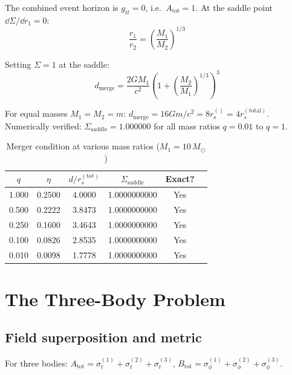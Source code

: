\documentclass[11pt,a4paper]{article}
\theoremstyle{plain}
\theoremstyle{definition}
\theoremstyle{remark}
\newcommand{\Ms}{M_\odot}
\newcommand{\sig}[2]{\sigma_{#1}^{(#2)}}
\newcommand{\rs}[1]{r_{\mathrm{s}}^{(#1)}}
\begin{document}
The combined event horizon is $g_{tt} = 0$, i.e.\ $A_{\mathrm{tot}} = 1$.  At the saddle point $\dd\Sigma/\dd r_1 = 0$:
\begin{equation}
  \frac{r_1}{r_2} = \left(\frac{M_1}{M_2}\right)^{1/3}
\end{equation}

Setting $\Sigma = 1$ at the saddle:
\begin{equation}
  \boxed{d_{\mathrm{merge}} = \frac{2GM_1}{c^2}\left(1 + \left(\frac{M_2}{M_1}\right)^{1/3}\right)^3}
  \label{eq:merger}
\end{equation}

For equal masses $M_1 = M_2 = m$: $d_{\mathrm{merge}} = 16Gm/c^2 = 8\rs{} = 4r_s^{(\mathrm{total})}$.  Numerically verified: $\Sigma_{\mathrm{saddle}} = 1.000000$ for all mass ratios $q = 0.01$ to $q = 1$.

\begin{table}[h]
  \centering
  \caption{Merger condition at various mass ratios ($M_1 = 10\,\Ms$)}
  \begin{tabular}{@{}cccccc@{}}
    \toprule
    $q$ & $\eta$ & $d/r_s^{(\mathrm{tot})}$ & $\Sigma_{\mathrm{saddle}}$ & Exact? \\
    \midrule
    1.000 & 0.2500 & 4.0000 & 1.0000000000 & Yes \\
    0.500 & 0.2222 & 3.8473 & 1.0000000000 & Yes \\
    0.250 & 0.1600 & 3.4643 & 1.0000000000 & Yes \\
    0.100 & 0.0826 & 2.8535 & 1.0000000000 & Yes \\
    0.010 & 0.0098 & 1.7778 & 1.0000000000 & Yes \\
    \bottomrule
  \end{tabular}
\end{table}

\section{The Three-Body Problem}
\label{sec:three_body}

\subsection{Field superposition and metric}

For three bodies: $A_{\mathrm{tot}} = \sig{t}{1} + \sig{t}{2} + \sig{t}{3}$, $B_{\mathrm{tot}} = \sig{\phi}{1} + \sig{\phi}{2} + \sig{\phi}{3}$.
\end{document}
